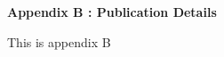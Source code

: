
\vspace*{5cm}
\begin{centering}
    \large
{\LARGE\bf Appendix B : Publication Details}\\
\end{centering}

\newpage

This is appendix B